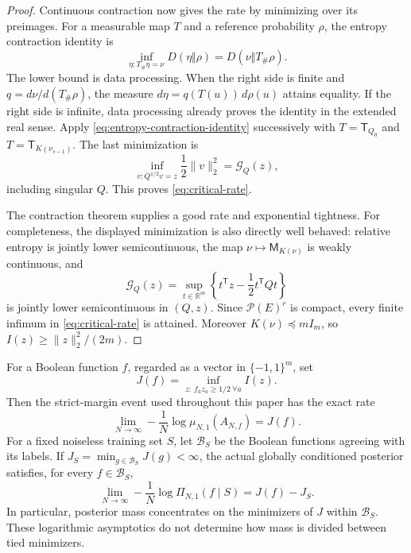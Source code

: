 \begin{proof}
Continuous contraction now gives the rate by minimizing over its preimages.
For a measurable map $T$ and a reference probability $\rho$, the entropy
contraction identity is
\begin{equation}\label{eq:entropy-contraction-identity}
 \inf_{\eta:T_\#\eta=\nu}D(\eta\Vert\rho)
 =D(\nu\Vert T_\#\rho).
\end{equation}
The lower bound is data processing. When the right side is finite and
$q=d\nu/d(T_\#\rho)$, the measure $d\eta=q(T(u))\,d\rho(u)$ attains
equality. If the right side is infinite, data processing already proves
the identity in the extended real sense. Apply
\eqref{eq:entropy-contraction-identity} successively with
$T=\mathsf T_{Q_0}$ and $T=\mathsf T_{K(\nu_{s-1})}$.
The last minimization is
\[
 \inf_{v:Q^{1/2}v=z}\frac12\|v\|_2^2=\mathcal G_Q(z),
\]
including singular $Q$. This proves \eqref{eq:critical-rate}.

The contraction theorem supplies a good rate and exponential tightness.
For completeness, the displayed minimization is also directly well behaved:
relative entropy is jointly lower semicontinuous, the map
$\nu\mapsto\mathsf M_{K(\nu)}$ is weakly continuous, and
\[
 \mathcal G_Q(z)=\sup_{t\in\mathbb R^m}
 \left\{t^{\mathsf T}z-\frac12t^{\mathsf T}Qt\right\}
\]
is jointly lower semicontinuous in $(Q,z)$. Since $\mathcal P(E)^r$ is
compact, every finite infimum in \eqref{eq:critical-rate} is attained.
Moreover $K(\nu)\preceq mI_m$, so $I(z)\geq\|z\|_2^2/(2m)$.
\end{proof}

\begin{corollary}
\label{cor:critical-margin-rates}
For a Boolean function $f$, regarded as a vector in $\{-1,1\}^m$, set
\[
 J(f)=\inf_{z:\ f_a z_a\geq1/2\ \forall a}I(z).
\]
Then the strict-margin event used throughout this paper has the exact rate
\begin{equation}\label{eq:critical-full-margin-rate}
 \lim_{N\to\infty}-\frac1N\log\mu_{N,1}(A_{N,f})=J(f).
\end{equation}
For a fixed noiseless training set $S$, let $\mathcal B_S$ be the Boolean
functions agreeing with its labels. If
$J_S=\min_{g\in\mathcal B_S}J(g)<\infty$, the actual globally conditioned
posterior satisfies, for every $f\in\mathcal B_S$,
\[
 \lim_{N\to\infty}-\frac1N\log\Pi_{N,1}(f\mid S)=J(f)-J_S.
\]
In particular, posterior mass concentrates on the minimizers of $J$ within
$\mathcal B_S$. These logarithmic asymptotics do not determine how mass is
divided between tied minimizers.
\end{corollary}

